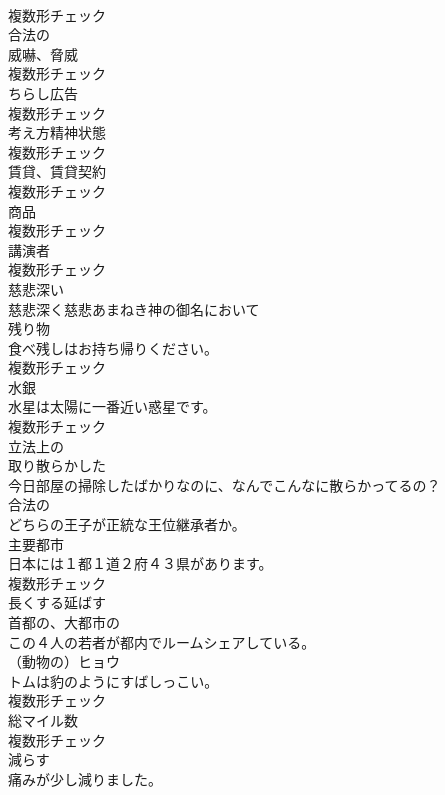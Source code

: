 \documentclass[8pt]{extreport}
\begin{document}
\begin{CJK}{UTF8}{min}
\\	複数形チェック
\\	[形容詞]	合法の	
\\	[名詞]	威嚇、脅威	
\\	複数形チェック
\\	[名詞]	ちらし広告	
\\	複数形チェック
\\	[名詞]	考え方精神状態	
\\	複数形チェック
\\	[名詞]	賃貸、賃貸契約	
\\	複数形チェック
\\	[名詞]	商品	
\\	複数形チェック
\\	[名詞]	講演者	
\\	複数形チェック
\\	[形容詞]	慈悲深い	
\\	慈悲深く慈悲あまねき神の御名において	
\\	[名詞]	残り物	
\\	食べ残しはお持ち帰りください。	
\\	複数形チェック
\\	[名詞]	水銀	
\\	水星は太陽に一番近い惑星です。	
\\	複数形チェック
\\	[形容詞]	立法上の	
\\	[形容詞]	取り散らかした	
\\	今日部屋の掃除したばかりなのに、なんでこんなに散らかってるの？	
\\	[形容詞]	合法の	
\\	どちらの王子が正統な王位継承者か。	
\\	[名詞]	主要都市	
\\	日本には１都１道２府４３県があります。	
\\	複数形チェック
\\	[動詞]	⻑くする延ばす	
\\	[形容詞]	首都の、大都市の	
\\	この４人の若者が都内でルームシェアしている。	
\\	[名詞]	（動物の）ヒョウ	
\\	トムは豹のようにすばしっこい。	
\\	複数形チェック
\\	[名詞]	総マイル数	
\\	複数形チェック
\\	[動詞]	減らす	
\\	痛みが少し減りました。	

\end{CJK}
\end{document}
